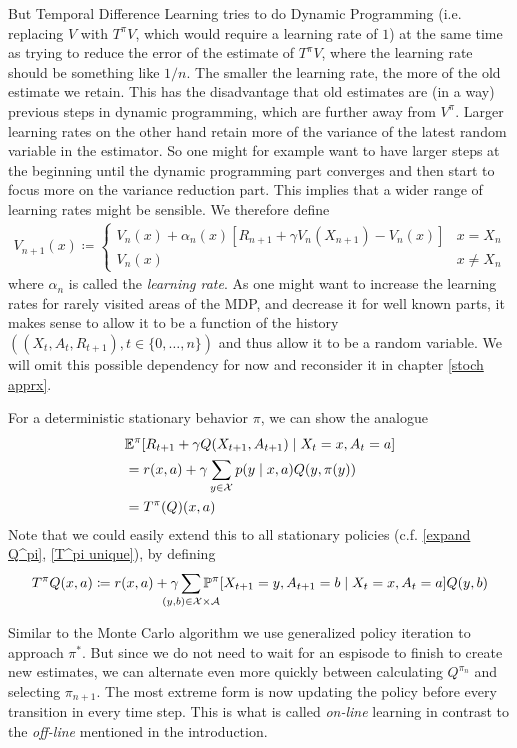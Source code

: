 But Temporal Difference Learning tries to do Dynamic Programming (i.e. replacing \(V\) with \(T^\pi V\), which would require a learning rate of \(1\)) at the same time as trying to reduce the error of the estimate of \(T^\pi V\), where the learning rate should be something like \(1/n\). The smaller the learning rate, the more of the old estimate we retain. This has the disadvantage that old estimates are (in a way) previous steps in dynamic programming, which are further away from \(V^\pi\). Larger learning rates on the other hand retain more of the variance of the latest random variable in the estimator. So one might for example want to have larger steps at the beginning until the dynamic programming part converges and then start to focus more on the variance reduction part. This implies that a wider range of learning rates might be sensible. We therefore define 
\begin{align}\label{TD learning}
	V_{n+1}(x) \coloneqq
	\begin{cases}
		V_n(x)+\alpha_n(x)[R_{n+1}+\gamma V_n(X_{n+1}) - V_n(x)] & x=X_n\\
		V_n(x) & x\neq X_n
	\end{cases}
\end{align}
where \(\alpha_n\) is called the \emph{learning rate}. As one might want to increase the learning rates for rarely visited areas of the MDP, and decrease it for well known parts, it makes sense to allow it to be a function of the history \(((X_t, A_t, R_{t+1}), t\in\{0,\dots, n\})\) and thus allow it to be a random variable. We will omit this possible dependency for now and reconsider it in chapter \ref{stoch apprx}.

For a deterministic stationary behavior \(\pi\), we can show the analogue 
\begin{align*}
	&\mathbb{E}^\pi[R_{t+1}+\gamma Q(X_{t+1}, A_{t+1})\mid X_t=x, A_t=a]\\
	&=r(x,a) +\gamma \sum_{y\in\mathcal{X}}p(y\mid x,a)Q(y,\pi(y))\\
	&= T^\pi(Q)(x,a)
\end{align*}
Note that we could easily extend this to all stationary policies (c.f. \ref{expand Q^pi}, \ref{T^pi unique}), by defining
\[
	T^\pi Q(x,a)\coloneqq r(x,a) +\gamma \smashoperator{\sum_{(y,b)\in\cX\times\cA}}\Pr^\pi[X_{t+1}=y,A_{t+1}=b\mid X_t=x,A_t=a]Q(y,b)
\]

Similar to the Monte Carlo algorithm we use generalized policy iteration to approach \(\pi^*\). But since we do not need to wait for an espisode to finish to create new estimates, we can alternate even more quickly between calculating \(Q^{\pi_n}\) and selecting \(\pi_{n+1}\). The most extreme form is now updating the policy before every transition in every time step. This is what is called \emph{on-line} learning in contrast to the \emph{off-line} mentioned in the introduction. 

